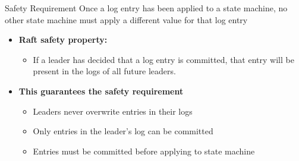 \begin{frame}
    \begin{block}{Safety Requirement}
        Once a log entry has been applied to a state machine, no other state machine must apply a different value for that log entry
    \end{block}
    \begin{itemize}
        \item \textbf{Raft safety property:}
            \begin{itemize}
                \item If a leader has decided that a log entry is committed, that entry will be present in the logs of all future leaders.
            \end{itemize}
        \item \textbf{This guarantees the safety requirement}
            \begin{itemize}
                \item Leaders never overwrite entries in their logs
                \item Only entries in the leader's log can be committed
                \item Entries must be committed before applying to state machine
            \end{itemize}
    \end{itemize}
\end{frame}

